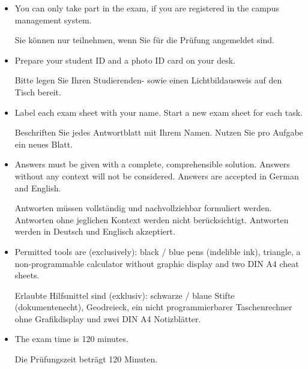 \begin{itemize}
	\item You can only take part in the exam, if you are registered in the campus management system.

	      \begin{germanblock}
		      Sie können nur teilnehmen, wenn Sie für die Prüfung angemeldet sind.
	      \end{germanblock}
	\item Prepare your student ID and a photo ID card on your desk.

	      \begin{germanblock}
		      Bitte legen Sie Ihren Studierenden- sowie einen Lichtbildausweis auf den Tisch bereit.
	      \end{germanblock}
	\item Label each exam sheet with your name. Start a new exam sheet for each task.

	      \begin{germanblock}
		      Beschriften Sie jedes Antwortblatt mit Ihrem Namen. Nutzen Sie pro  Aufgabe ein neues Blatt.
	      \end{germanblock}
	\item Answers must be given with a complete, comprehensible solution. Answers without any context will not be considered. Answers are accepted in German and English.

	      \begin{germanblock}
		      Antworten müssen vollständig und nachvollziehbar formuliert werden. Antworten ohne jeglichen Kontext werden nicht berücksichtigt. Antworten werden in Deutsch und Englisch akzeptiert.
	      \end{germanblock}
	\item Permitted tools are (exclusively): black / blue pens (indelible ink), triangle, a non-programmable calculator without graphic display and two DIN A4 cheat sheets.

	      \begin{germanblock}
		      Erlaubte Hilfsmittel sind (exklusiv): schwarze / blaue Stifte (dokumentenecht), Geodreieck, ein nicht programmierbarer Taschenrechner ohne Grafikdisplay und zwei DIN A4 Notizblätter.
	      \end{germanblock}
	\item The exam time is 120 minutes.

	      \begin{germanblock}
		      Die Prüfungszeit beträgt 120 Minuten.
	      \end{germanblock}
\end{itemize}

